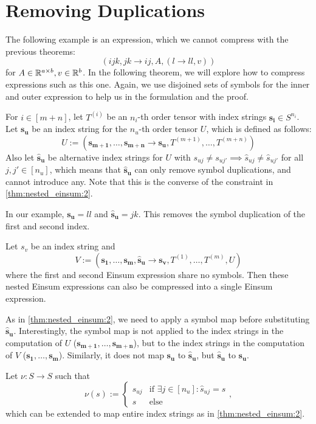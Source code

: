 \section{Removing Duplications}

The following example is an expression, which we cannot compress with the previous theorems:
$$(ijk, jk \rightarrow ij, A, (l \rightarrow ll, v))$$
for $A \in \mathbb{R}^{a \times b}, v \in \mathbb{R}^b$.
In the following theorem, we will explore how to compress expressions such as this one.
Again, we use disjoined sets of symbols for the inner and outer expression to help us in the formulation and the proof.

\begin{theorem}
    \label{thm:nested_einsum:3}

    For $i \in [m + n]$, let $T^{(i)}$ be an $n_i$-th order tensor with index strings $\bm{s_i} \in S^{n_i}$.
    Let $\bm{s_u}$ be an index string for the $n_u$-th order tensor $U$, which is defined as follows:
    $$U := (\bm{s_{m + 1}},\dots,\bm{s_{m + n}} \rightarrow \bm{s_u}, T^{(m + 1)},\dots,T^{(m + n)})$$
    Also let $\bm{\hat{s}_u}$ be alternative index strings for $U$ with $s_{uj} \neq s_{uj'} \implies \hat{s}_{uj} \neq \hat{s}_{uj'}$ for all $j, j' \in [n_u]$,
    which means that $\bm{\hat{s}_u}$ can only remove symbol duplications, and cannot introduce any.
    Note that this is the converse of the constraint in \autoref{thm:nested_einsum:2}.

    In our example, $\bm{s_u} = ll$ and $\bm{\hat{s}_u} = jk$.
    This removes the symbol duplication of the first and second index.

    Let $s_v$ be an index string and
    $$V := (\bm{s_1},\dots,\bm{s_m}, \bm{\hat{s}_u} \rightarrow \bm{s_v}, T^{(1)},\dots,T^{(m)}, U)$$
    where the first and second Einsum expression share no symbols.
    Then these nested Einsum expressions can also be compressed into a single Einsum expression.

    As in \autoref{thm:nested_einsum:2}, we need to apply a symbol map before substituting $\bm{\hat{s}_u}$.
    Interestingly, the symbol map is not applied to the index strings in the computation of $U$ ($\bm{s_{m + 1}},\dots,\bm{s_{m + n}}$),
    but to the index strings in the computation of $V$ ($\bm{s_1},\dots,\bm{s_m}$).
    Similarly, it does not map $\bm{s_u}$ to $\bm{\hat{s}_u}$, but $\bm{\hat{s}_u}$ to $\bm{s_u}$.

    Let $\nu: S \rightarrow S$ such that
    $$\nu(s) := \begin{cases}
            s_{uj} & \text{if }\exists j \in [n_u]: \hat{s}_{uj} = s \\
            s      & \text{else}
        \end{cases},$$
    which can be extended to map entire index strings as in \autoref{thm:nested_einsum:2}.


\end{theorem}
